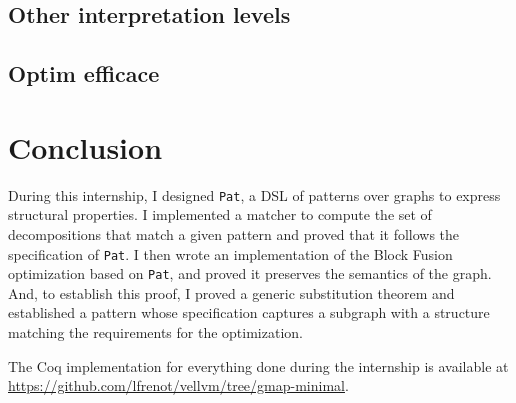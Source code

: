 \documentclass[11pt]{article}
\newcommand{\pat}{\texttt{Pat}\xspace}
\begin{document}



\subsection{Other interpretation levels}

\subsection{Optim efficace}

\section*{Conclusion}
\label{sec:ccl}

During this internship, I designed \pat, a DSL of patterns over graphs to express structural properties. I implemented a matcher to compute the set of decompositions that match a given pattern and proved that it follows the specification of \pat.
I then wrote an implementation of the Block Fusion optimization based on \pat, and proved it preserves the semantics of the graph. And, to establish this proof, I proved a generic substitution theorem and established a pattern whose specification captures a subgraph with a structure matching the requirements for the optimization.

The Coq implementation for everything done during the internship is available at \url{https://github.com/lfrenot/vellvm/tree/gmap-minimal}.

\printbibliography
\end{document}
